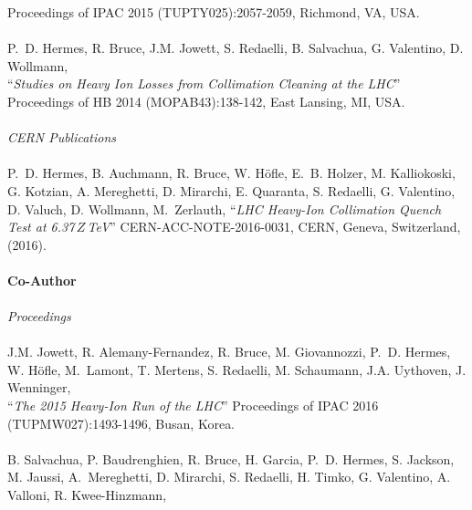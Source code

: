 Proceedings of IPAC 2015 (TUPTY025):2057-2059, Richmond, VA, USA. 
%
\\ \mbox{} \\
P.~D. Hermes, R. Bruce, J.M. Jowett, S. Redaelli, B. Salvachua, G. Valentino, D. Wollmann,  \\ 
``\textit{Studies on Heavy Ion Losses from Collimation Cleaning at the LHC}'' \newline
Proceedings of HB 2014 (MOPAB43):138-142, East Lansing, MI, USA. 
\\ \mbox{} \\
\textit{CERN Publications}
\\ \mbox{} \\
%
P.~D. Hermes, B. Auchmann, R. Bruce, W. H\"{o}fle, E.~B. Holzer, M. Kalliokoski, G. Kotzian, A. Mereghetti, D. Mirarchi, E. Quaranta, S. Redaelli, G. Valentino, D. Valuch, D. Wollmann, \mbox{M. Zerlauth}, ``\textit{LHC Heavy-Ion Collimation Quench Test at 6.37$\,Z\,$TeV}'' \newline
CERN-ACC-NOTE-2016-0031, CERN, Geneva, Switzerland, (2016).
%
\\ \mbox{} \\
\large{\textbf{Co-Author}}
\normalsize
%
\\ \mbox{} \\
\textit{Proceedings}
%
%
%
\\ \mbox{} \\
J.M. Jowett, R. Alemany-Fernandez, R. Bruce, M. Giovannozzi, P.~D. Hermes, W. H\"{o}fle, \mbox{M. Lamont}, T. Mertens, S. Redaelli, M. Schaumann, J.A. Uythoven, J. Wenninger, \\ 
``\textit{The 2015 Heavy-Ion Run of the LHC}'' \newline
Proceedings of IPAC 2016 (TUPMW027):1493-1496, Busan, Korea. 
% 	
\\ \mbox{} \\
B. Salvachua, P. Baudrenghien, R. Bruce, H. Garcia, P.~D. Hermes, S. Jackson, M. Jaussi, \mbox{A. Mereghetti}, D. Mirarchi, S. Redaelli, H. Timko, G. Valentino, A. Valloni, R. Kwee-Hinzmann, \\ 
